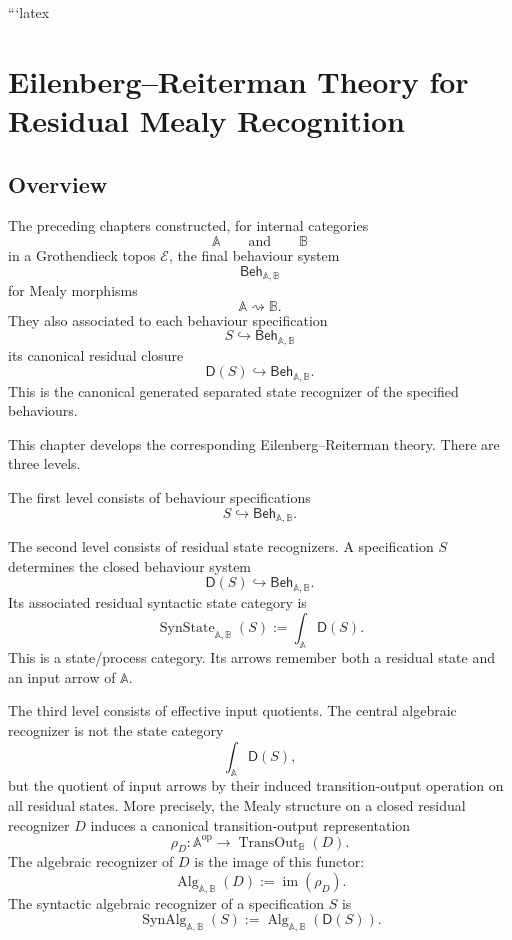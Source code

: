 ```latex
\chapter{Eilenberg--Reiterman Theory for Residual Mealy Recognition}
\label{ch:eilenberg-reiterman-residual-mealy-recognition}

\section{Overview}
\label{sec:eilenberg-reiterman-overview}

The preceding chapters constructed, for internal categories
\[
\mathbb A
\qquad\text{and}\qquad
\mathbb B
\]
in a Grothendieck topos \(\mathcal E\), the final behaviour system
\[
\mathsf{Beh}_{\mathbb A,\mathbb B}
\]
for Mealy morphisms
\[
\mathbb A\rightsquigarrow\mathbb B.
\]
They also associated to each behaviour specification
\[
S\hookrightarrow \mathsf{Beh}_{\mathbb A,\mathbb B}
\]
its canonical residual closure
\[
\mathsf D(S)\hookrightarrow \mathsf{Beh}_{\mathbb A,\mathbb B}.
\]
This is the canonical generated separated state recognizer of the specified
behaviours.

This chapter develops the corresponding Eilenberg--Reiterman theory. There
are three levels.

The first level consists of behaviour specifications
\[
S\hookrightarrow \mathsf{Beh}_{\mathbb A,\mathbb B}.
\]

The second level consists of residual state recognizers. A specification
\(S\) determines the closed behaviour system
\[
\mathsf D(S)\hookrightarrow \mathsf{Beh}_{\mathbb A,\mathbb B}.
\]
Its associated residual syntactic state category is
\[
\operatorname{SynState}_{\mathbb A,\mathbb B}(S)
:=
\int_{\mathbb A}\mathsf D(S).
\]
This is a state/process category. Its arrows remember both a residual state
and an input arrow of \(\mathbb A\).

The third level consists of effective input quotients. The central algebraic
recognizer is not the state category
\[
\int_{\mathbb A}\mathsf D(S),
\]
but the quotient of input arrows by their induced transition-output operation
on all residual states. More precisely, the Mealy structure on a closed
residual recognizer \(D\) induces a canonical transition-output
representation
\[
\rho_D:
\mathbb A^{\mathrm{op}}
\longrightarrow
\operatorname{TransOut}_{\mathbb B}(D).
\]
The algebraic recognizer of \(D\) is the image of this functor:
\[
\operatorname{Alg}_{\mathbb A,\mathbb B}(D)
:=
\operatorname{im}(\rho_D).
\]
The syntactic algebraic recognizer of a specification \(S\) is
\[
\operatorname{SynAlg}_{\mathbb A,\mathbb B}(S)
:=
\operatorname{Alg}_{\mathbb A,\mathbb B}(\mathsf D(S)).
\]

